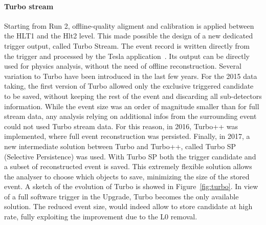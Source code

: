 \paragraph{Turbo stream}
Starting from Run 2, offline-quality aligment and calibration is applied between the HLT1 and the Hlt2 level. This made possible the design of a new dedicated
trigger output, called Turbo Stream. The event record is written directly from the trigger and processed by the Tesla application~\cite{Aaij:2016rxn}. Its output can be directly used for physics analysis, without the need of offline reconstruction.
Several variation to Turbo have been introduced in the last few years. For the 2015 data taking, the first version of Turbo allowed only the exclusive triggered candidate to be saved, without keeping the rest of the event and discarding all sub-detectors information. 
While the event size was an order of magnitude smaller than for full stream data, any analysis relying on additional infos from the surrounding event could not used Turbo stream data. 
For this reason, in 2016, Turbo++ was implemented, where full event reconstruction was  persisted. Finally, in  2017, a new intermediate solution between Turbo and Turbo++, called Turbo SP (Selective Persistence) was used. With Turbo SP both the trigger candidate and a subset of reconstructed event is saved. This extremely flexible solution allows the analyser to choose which objects to save, minimizing the size of the stored event. A sketch of the evolution of Turbo is showed in Figure~\ref{fig:turbo}.
In view of a full software trigger in the Upgrade, Turbo becomes the only available solution. The reduced event size, would indeed allow to store candidate at high rate, fully exploiting the improvement due to the L0 removal.  


